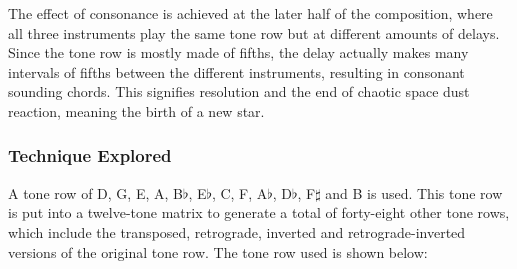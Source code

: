 \documentclass{article}
\begin{document}
The effect of consonance is achieved at the later half of the composition,
where all three instruments play the same tone row but at different amounts of
delays. Since the tone row is mostly made of fifths, the delay actually makes
many intervals of fifths between the different instruments, resulting in
consonant sounding chords. This signifies resolution and the end of chaotic
space dust reaction, meaning the birth of a new star.\\

\subsubsection{Technique Explored}

A tone row of D, G, E, A, B\(\flat\), E\(\flat\), C, F, A\(\flat\), D\(\flat\),
F\(\sharp\) and B is used. This tone row is put into a twelve-tone matrix to
generate a total of forty-eight other tone rows, which include the transposed,
retrograde, inverted and retrograde-inverted versions of the original tone row.
The tone row used is shown below:\\
\end{document}
